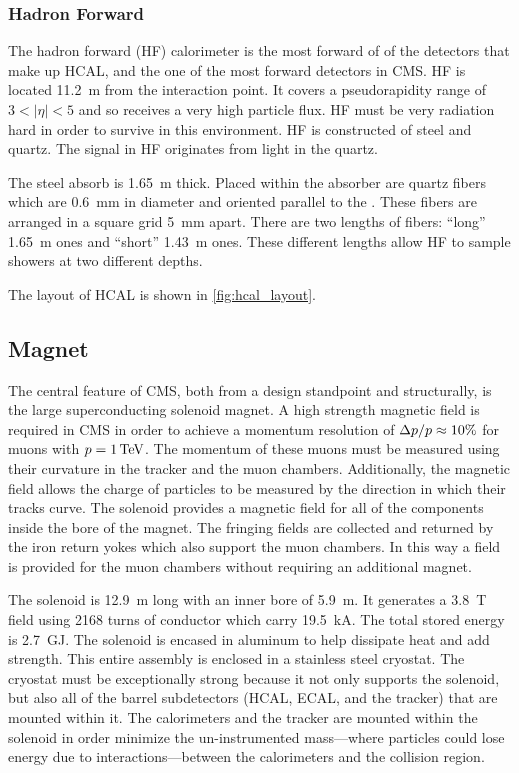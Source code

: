 \subsubsection{Hadron Forward}

The hadron forward (HF) calorimeter is the most forward of of the detectors
that make up HCAL, and the one of the most forward detectors in CMS. HF is
located \SI{11.2}{\meter} from the interaction point. It covers a pseudorapidity
range of $3 < |\eta| < 5$ and so receives a very high particle flux. HF must be
very radiation hard in order to survive in this environment. HF is constructed
of steel and quartz. The signal in HF originates from \Cherenkov light in the
quartz.

The steel absorb is \SI{1.65}{\meter} thick. Placed within the absorber are
quartz fibers which are \SI{0.6}{\milli\meter} in diameter and oriented
parallel to the \zaxis. These fibers are arranged in a square grid
\SI{5}{\milli\meter} apart. There are two lengths of fibers: ``long''
\SI{1.65}{\meter} ones and ``short'' \SI{1.43}{\meter} ones. These different
lengths allow HF to sample showers at two different depths.

The layout of HCAL is shown in \cref{fig:hcal_layout}.

\subsection{Magnet}

The central feature of CMS, both from a design standpoint and structurally, is
the large superconducting solenoid magnet. A high strength magnetic field is
required in CMS in order to achieve a momentum resolution of $\Delta p
/ p \approx 10\%$ for muons with $\momentum = \SI{1}{\TeV}$. The
momentum of these muons must be measured using their curvature in the tracker
and the muon chambers. Additionally, the magnetic field allows the charge of
particles to be measured by the direction in which their tracks curve. The
solenoid provides a magnetic field for all of the components inside the bore of
the magnet. The fringing fields are collected and returned by the iron return
yokes which also support the muon chambers. In this way a field is provided for
the muon chambers without requiring an additional magnet.

The solenoid is \SI{12.9}{\meter} long with an inner bore of \SI{5.9}{\meter}.
It generates a \SI{3.8}{\tesla} field using \num{2168} turns of conductor which
carry \SI{19.5}{\kilo\ampere}. The total stored energy is
\SI{2.7}{\giga\joule}. The solenoid is encased in aluminum to help dissipate
heat and add strength. This entire assembly is enclosed in a stainless steel
cryostat. The cryostat must be exceptionally strong because it not only
supports the solenoid, but also all of the barrel subdetectors (HCAL, ECAL, and
the tracker) that are mounted within it. The calorimeters and the tracker are
mounted within the solenoid in order minimize the un-instrumented mass---where
particles could lose energy due to interactions---between the calorimeters and
the collision region.

